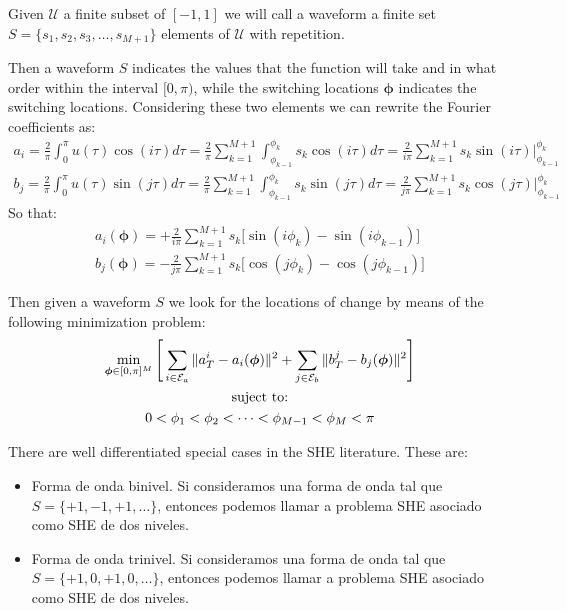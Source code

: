 \begin{defi}[Waveform]
    Given $ \mathcal {U} $ a finite subset of $ [- 1,1] $ we will call a waveform a finite set $ S = \{s_1, s_2, s_3, \dots, s_ {M + 1} \} $ elements of  $ \mathcal {U} $ with repetition.
\end{defi}


Then a waveform $ S $ indicates the values that the function will take and in what order within the interval $ [0, \pi) $, while the switching locations $ \bm {\phi} $ indicates the switching locations. Considering these two elements we can rewrite the Fourier coefficients as:
\begin{gather}
    a_i = \frac{2}{\pi} \int_0^\pi u(\tau ) \cos(i \tau)d\tau  = \frac{2}{\pi} \sum_{k =  1}^{M+1} 
    \int_{\phi_{k-1}}^{\phi_{k}} s_k  \cos(i\tau)d\tau = \frac{2}{i\pi} \sum_{k=1}^{M+1} s_k \sin(i\tau) \Big|_{\phi_{k-1}}^{\phi_k} 
\end{gather}
\begin{gather}
    b_j = \frac{2}{\pi} \int_0^\pi u(\tau ) \sin(j \tau)d\tau =
    \frac{2}{\pi} \sum_{k =1}^{M+1} 
    \int_{\phi_{k-1}}^{\phi_{k}} s_k \sin(j\tau)d\tau = 
    \frac{2}{j\pi} \sum_{k=1}^{M+1} 
    s_k \cos(j\tau) \Big|_{\phi_{k-1}}^{\phi_k} 
\end{gather}
So that:
\begin{gather}
    a_i(\bm{\phi}) = +\frac{2}{i\pi}  \sum_{k=1}^{M+1} s_k \Big[ \sin(i\phi_k) -\sin(i\phi_{k-1})\Big] \\
    b_j(\bm{\phi}) = -\frac{2}{j\pi}  \sum_{k=1}^{M+1} s_k \Big[ \cos(j\phi_k) -\cos(j\phi_{k-1})\Big]
\end{gather}


\begin{problem}
    Then given a waveform $ S $ we look for the locations of change by means of the following minimization problem:
        \begin{gather} 
        \min_{\bm{\phi} \in [0,\pi]^{M} }  \Bigg[
        \sum_{i \in \mathcal{E}_a} \| a_T^i - a_i(\bm{\phi}) \|^2 +
        \sum_{j \in \mathcal{E}_b} \| b_T^j - b_j(\bm{\phi}) \|^2 \Bigg]
        \\
        \notag \text{suject to:}
        \\
        0 <\phi_1 < \phi_2 < \dots < \phi_{M-1} < \phi_{M} < \pi  
    \end{gather}
\end{problem}
There are well differentiated special cases in the SHE literature. These are:
\begin{itemize}
    \item Forma de onda binivel. Si consideramos una forma de onda tal que $ S = \{+1,-1,+1,\dots\} $, entonces podemos llamar a problema SHE asociado como SHE de dos niveles.

    \item Forma de onda trinivel. Si consideramos una forma de onda tal que $ S = \{+1,0,+1,0,\dots\} $, entonces podemos llamar a problema SHE asociado como SHE de dos niveles.

\end{itemize}


